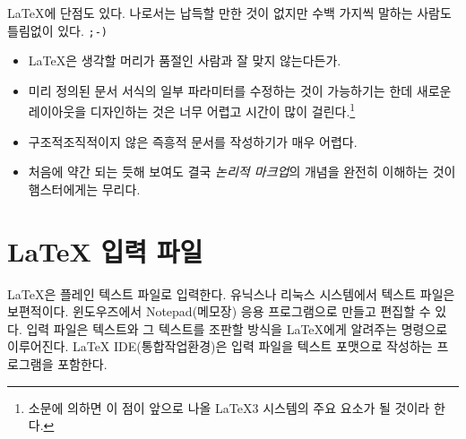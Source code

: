 \medskip

\noindent \LaTeX 에 단점도 있다. 나로서는 납득할 만한 것이 없지만 수백 가지씩 말하는 사람도 틀림없이 있다. \texttt{;-)}

\begin{itemize} \firmlist
\item \LaTeX 은 생각할 머리가 품절인 사람과 잘 맞지 않는다든가\hdots\hdots.
\item 미리 정의된 문서 서식의 일부 파라미터를 수정하는 것이 가능하기는 한데 새로운 레이아웃을 디자인하는 것은 너무 어렵고 시간이 많이 걸린다.\footnote{%
  소문에 의하면 이 점이 앞으로 나올 \LaTeX 3 시스템의 주요 요소가 될 것이라 한다.
}
\item 구조적\cntrdot 조직적이지 않은 즉흥적 문서를 작성하기가 매우 어렵다.
\item 처음에 약간 되는 듯해 보여도 결국 \emph{논리적 마크업}의 개념을 완전히 이해하는 것이 햄스터에게는 무리다.
\end{itemize}

\section{\LaTeX{} 입력 파일}

\LaTeX 은 플레인 텍스트 파일로 입력한다. 유닉스나 리눅스 시스템에서 텍스트 파일은 보편적이다. 윈도우즈에서 
Notepad(메모장) 응용 프로그램으로 만들고 편집할 수 있다.
입력 파일은 텍스트와 그 텍스트를 조판할 방식을 \LaTeX 에게 알려주는 명령으로 이루어진다. 
\LaTeX{} IDE(통합작업환경)은 입력 파일을 텍스트 포맷으로 작성하는 프로그램을 포함한다.

